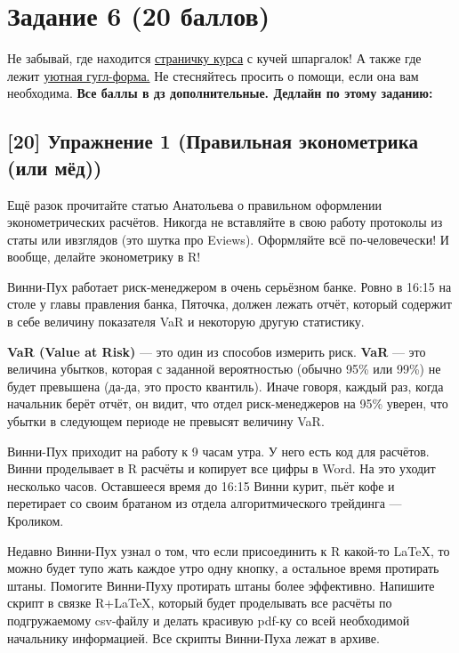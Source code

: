 \documentclass[12pt, a4paper, oneside]{article}
\begin{document}
\section*{Задание 6 (20 баллов)  }

Не забывай, где находится  \href{https://fulyankin.github.io/LaTeX/}{страничку курса} с кучей шпаргалок! А также где лежит \href{https://docs.google.com/forms/d/e/1FAIpQLSe11kxKVfv07iCL1E9yNX7ll9swKImiVwRr1H70lslGzInRSg/viewform}{уютная гугл-форма.} Не стесняйтесь просить о помощи, если она вам необходима. \textbf{Все баллы в дз дополнительные. Дедлайн по этому заданию:  }  


\subsection*{[20]   Упражнение 1 (Правильная эконометрика (или мёд)) }


Ещё разок прочитайте статью Анатольева о правильном оформлении эконометрических расчётов. Никогда не вставляйте в свою работу протоколы из статы или ивзглядов (это шутка про Eviews). Оформляйте всё по-человечески!  И вообще, делайте эконометрику в R!

Винни-Пух работает риск-менеджером в очень серьёзном банке. Ровно в 16:15 на столе у главы правления банка, Пяточка, должен лежать отчёт, который содержит в себе величину показателя VaR и некоторую другую статистику.

\textbf{VaR (Value at Risk)}  --- это один из способов измерить риск. \textbf{VaR} --- это величина убытков, которая с заданной вероятностью (обычно 95\% или 99\%) не будет превышена (да-да, это просто квантиль). Иначе говоря, каждый раз, когда начальник берёт отчёт, он видит, что отдел риск-менеджеров на 95\% уверен, что убытки в следующем периоде не превысят величину VaR.

Винни-Пух приходит на работу к 9 часам утра. У него есть код для расчётов. Винни проделывает в R расчёты и копирует все цифры в Word. На это уходит несколько часов. Оставшееся время до 16:15 Винни курит, пьёт кофе и перетирает со своим братаном из отдела алгоритмического трейдинга --- Кроликом.

Недавно Винни-Пух узнал о том, что если присоединить к R какой-то \LaTeX{}, то можно будет тупо жать каждое утро одну кнопку, а остальное время протирать штаны. Помогите Винни-Пуху протирать штаны более эффективно. Напишите скрипт в связке R+\LaTeX{}, который будет проделывать все расчёты по подгружаемому csv-файлу и делать красивую pdf-ку со всей необходимой начальнику информацией. Все скрипты Винни-Пуха лежат в архиве.
\end{document}
